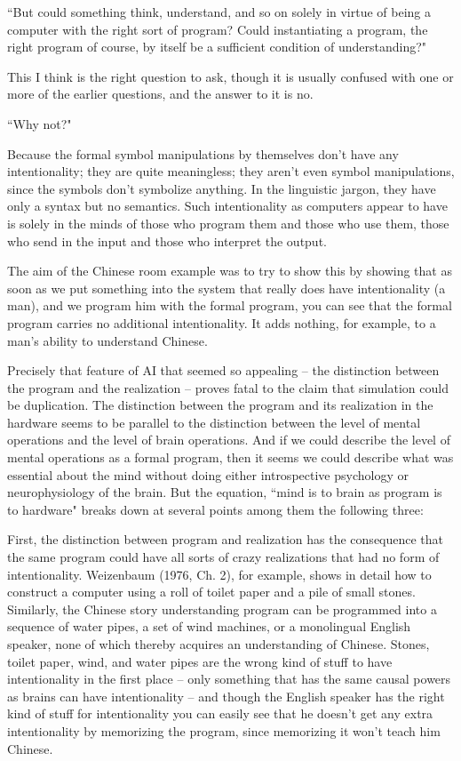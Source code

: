 ``But could something think, understand, and so on solely in virtue of being a computer with the right sort of
program? Could instantiating a program, the right program of course, by itself be a sufficient condition of
understanding?"

This I think is the right question to ask, though it is usually confused with one or more of the earlier questions,
and the answer to it is no.

``Why not?"

Because the formal symbol manipulations by themselves don't have any intentionality; they are quite
meaningless; they aren't even symbol manipulations, since the symbols don't symbolize anything. In the linguistic
jargon, they have only a syntax but no semantics. Such intentionality as computers appear to have is solely in
the minds of those who program them and those who use them, those who send in the input and those who
interpret the output.

The aim of the Chinese room example was to try to show this by showing that as soon as we put something into the system that really does have intentionality (a man), and we program him with the formal program, you
can see that the formal program carries no additional intentionality. It adds nothing, for example, to a man's
ability to understand Chinese.

Precisely that feature of AI that seemed so appealing -- the distinction between the program and the realization
-- proves fatal to the claim that simulation could be duplication. The distinction between the program and its
realization in the hardware seems to be parallel to the distinction between the level of mental operations and the
level of brain operations. And if we could describe the level of mental operations as a formal program, then it
seems we could describe what was essential about the mind without doing either introspective psychology or
neurophysiology of the brain. But the equation, ``mind is to brain as program is to hardware" breaks down at
several points among them the following three:

First, the distinction between program and realization has the consequence that the same program could have
all sorts of crazy realizations that had no form of intentionality. Weizenbaum (1976, Ch. 2), for example, shows
in detail how to construct a computer using a roll of toilet paper and a pile of small stones. Similarly, the Chinese
story understanding program can be programmed into a sequence of water pipes, a set of wind machines, or a
monolingual English speaker, none of which thereby acquires an understanding of Chinese. Stones, toilet paper,
wind, and water pipes are the wrong kind of stuff to have intentionality in the first place -- only something that
has the same causal powers as brains can have intentionality -- and though the English speaker has the right
kind of stuff for intentionality you can easily see that he doesn't get any extra intentionality by memorizing the
program, since memorizing it won't teach him Chinese.

